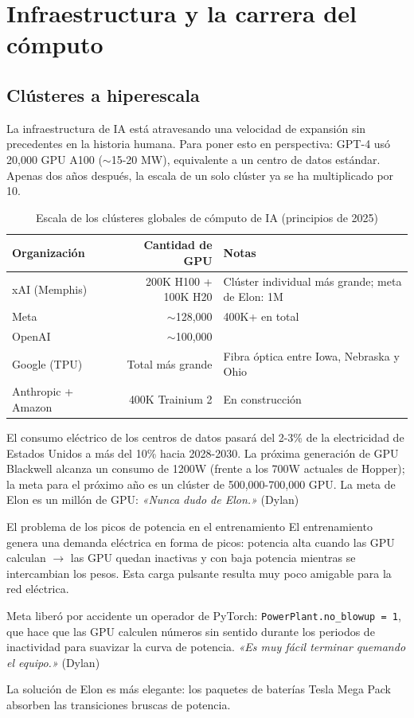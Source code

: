 \section{Infraestructura y la carrera del cómputo}

\subsection{Clústeres a hiperescala}

La infraestructura de IA está atravesando una velocidad de expansión sin precedentes en la historia humana. Para poner esto en perspectiva: GPT-4 usó 20,000 GPU A100 ($\sim$15-20 MW), equivalente a un centro de datos estándar. Apenas dos años después, la escala de un solo clúster ya se ha multiplicado por 10.

\begin{table}[H]
\centering
\begin{tabular}{lrl}
\toprule
\textbf{Organización} & \textbf{Cantidad de GPU} & \textbf{Notas} \\
\midrule
xAI (Memphis) & 200K H100 + 100K H20 & Clúster individual más grande; meta de Elon: 1M \\
Meta & $\sim$128,000 & 400K+ en total \\
OpenAI & $\sim$100,000 & \\
Google (TPU) & Total más grande & Fibra óptica entre Iowa, Nebraska y Ohio \\
Anthropic + Amazon & 400K Trainium 2 & En construcción \\
\bottomrule
\end{tabular}
\caption{Escala de los clústeres globales de cómputo de IA (principios de 2025)}
\end{table}

El consumo eléctrico de los centros de datos pasará del 2-3\% de la electricidad de Estados Unidos a más del 10\% hacia 2028-2030. La próxima generación de GPU Blackwell alcanza un consumo de 1200W (frente a los 700W actuales de Hopper); la meta para el próximo año es un clúster de 500,000-700,000 GPU. La meta de Elon es un millón de GPU: \textit{«Nunca dudo de Elon.»} (Dylan)

\begin{knowledgebox}{El problema de los picos de potencia en el entrenamiento}
El entrenamiento genera una demanda eléctrica en forma de picos: potencia alta cuando las GPU calculan $\to$ las GPU quedan inactivas y con baja potencia mientras se intercambian los pesos. Esta carga pulsante resulta muy poco amigable para la red eléctrica.

Meta liberó por accidente un operador de PyTorch: \texttt{PowerPlant.no\_blowup = 1}, que hace que las GPU calculen números sin sentido durante los periodos de inactividad para suavizar la curva de potencia. \textit{«Es muy fácil terminar quemando el equipo.»} (Dylan)

La solución de Elon es más elegante: los paquetes de baterías Tesla Mega Pack absorben las transiciones bruscas de potencia.
\end{knowledgebox}

